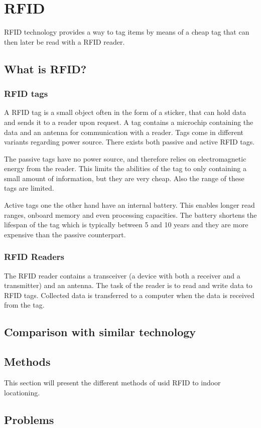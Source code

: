 \section{RFID}
RFID technology provides a way to tag items by means of a cheap tag that can then later be read with a RFID reader.

\subsection{What is RFID?}
\subsubsection{RFID tags} 
A RFID tag is a small object often in the form of a sticker, that can hold data and sends it to a reader upon request.
A tag contains a microchip containing the data and an antenna for communication with a reader.
Tags come in different variants regarding power source.
There exists both passive and active RFID tags.\cite{rfidreview}

The passive tags have no power source, and therefore relies on electromagnetic energy from the reader.
This limits the abilities of the tag to only containing a small amount of information, but they are very cheap.
Also the range of these tags are limited. \cite{rfidreview}

Active tags one the other hand have an internal battery.
This enables longer read ranges, onboard memory and even processing capacities.
The battery shortens the lifespan of the tag which is typically between 5 and 10 years and they are more expensive than the passive counterpart. \cite{rfidreview}

\subsubsection{RFID Readers}
The RFID reader contains a transceiver (a device with both a receiver and a transmitter) and an antenna.
The task of the reader is to read and write data to RFID tags.
Collected data is transferred to a computer when the data is received from the tag.\cite{rfidreview}

\subsection{Comparison with similar technology}

\subsection{Methods}
This section will present the different methods of usid RFID to indoor locationing.



\subsection{Problems}